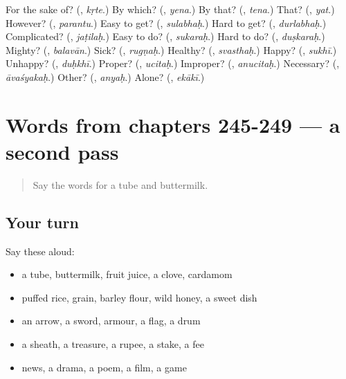 \begin{tcolorbox}[breakable,colback=teal!4,colframe=teal!35!black,title={Before you move on}]
For the sake of? (\textbf{}, \emph{kṛte}.) By which? (\textbf{}, \emph{yena}.) By that? (\textbf{}, \emph{tena}.) That? (\textbf{}, \emph{yat}.) However? (\textbf{}, \emph{parantu}.) Easy to get? (\textbf{}, \emph{sulabhaḥ}.) Hard to get? (\textbf{}, \emph{durlabhaḥ}.) Complicated? (\textbf{}, \emph{jaṭilaḥ}.) Easy to do? (\textbf{}, \emph{sukaraḥ}.) Hard to do? (\textbf{}, \emph{duṣkaraḥ}.) Mighty? (\textbf{}, \emph{balavān}.) Sick? (\textbf{}, \emph{rugṇaḥ}.) Healthy? (\textbf{}, \emph{svasthaḥ}.) Happy? (\textbf{}, \emph{sukhī}.) Unhappy? (\textbf{}, \emph{duḥkhī}.) Proper? (\textbf{}, \emph{ucitaḥ}.) Improper? (\textbf{}, \emph{anucitaḥ}.) Necessary? (\textbf{}, \emph{āvaśyakaḥ}.) Other? (\textbf{}, \emph{anyaḥ}.) Alone? (\textbf{}, \emph{ekākī}.)
\end{tcolorbox}
\section[(dialogue)]{Words from chapters 245-249 — a second pass}

\label{lesson:SA-R249-second-pass-words-from-chapters-245-249}



\begin{quote}
Say the words for a tube and buttermilk.
\end{quote}

\subsection*{Your turn}
Say these aloud:

\begin{itemize}
\raggedright
  \item a tube, buttermilk, fruit juice, a clove, cardamom
  \item puffed rice, grain, barley flour, wild honey, a sweet dish
  \item an arrow, a sword, armour, a flag, a drum
  \item a sheath, a treasure, a rupee, a stake, a fee
  \item news, a drama, a poem, a film, a game
\end{itemize}

